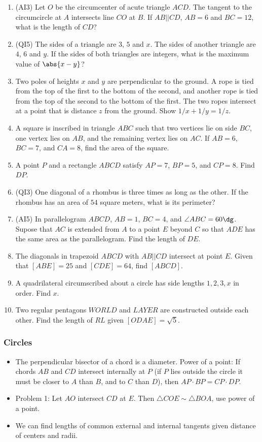 \documentclass[10pt,paper=letter]{scrartcl}
\begin{document}
\begin{enumerate}
  \item (AI3) Let $O$ be the circumcenter of acute triangle $ACD$. The tangent to the circumcircle at $A$ intersects line $CO$ at $B$. If $AB||CD$, $AB = 6$ and $BC = 12$, what is the length of $CD$?
  \item (QI5) The sides of a triangle are $3$, $5$ and $x$. The sides of another triangle are $4$, $6$ and $y$. If the sides of both triangles are integers, what is the maximum value of $\abs{x - y}$?
  \item Two poles of heights $x$ and $y$ are perpendicular to the ground. A rope is tied from the top of the first to the bottom of the second, and another rope is tied from the top of the second to the bottom of the first. The two ropes intersect at a point that is distance $z$ from the ground. Show $1/x + 1/y = 1/z$.
  \item A square is inscribed in triangle $ABC$ such that two vertices lie on side $BC$, one vertex lies on $AB$, and the remaining vertex lies on $AC$. If $AB = 6$, $BC = 7$, and $CA = 8$, find the area of the square.
  \item A point $P$ and a rectangle $ABCD$ satisfy $AP = 7$, $BP = 5$, and $CP = 8$. Find $DP$.
  \item (QI3) One diagonal of a rhombus is three times as long as the other. If the rhombus has an area of $54$ square meters, what is its perimeter?
  \item (AI5) In parallelogram $ABCD$, $AB = 1$, $BC = 4$, and $\angle ABC = 60\dg$. Supose that $AC$ is extended from $A$ to a point $E$ beyond $C$ so that $ADE$ has the same area as the parallelogram. Find the length of $DE$.
  \item The diagonals in trapezoid $ABCD$ with $AB||CD$ intersect at point $E$. Given that $[ABE] = 25$ and $[CDE] = 64$, find $[ABCD]$.
  \item A quadrilateral circumscribed about a circle has side lengths $1, 2, 3, x$ in order. Find $x$.
  \item Two regular pentagons $WORLD$ and $LAYER$ are constructed outside each other. Find the length of $RL$ given $[ODAE] = \sqrt5$.
\end{enumerate}

\subsubsection*{Circles}

\begin{itemize}
  \item The perpendicular bisector of a chord is a diameter. Power of a point: If chords $AB$ and $CD$ intersect internally at $P$ (if $P$ lies outside the circle it must be closer to $A$ than $B$, and to $C$ than $D$), then $AP \cdot BP = CP \cdot DP$.
  \item Problem 1: Let $AO$ intersect $CD$ at $E$. Then $\triangle COE \sim \triangle BOA$, use power of a point.
  \item We can find lengths of common external and internal tangents given distance of centers and radii.
\end{itemize}
\end{document}

